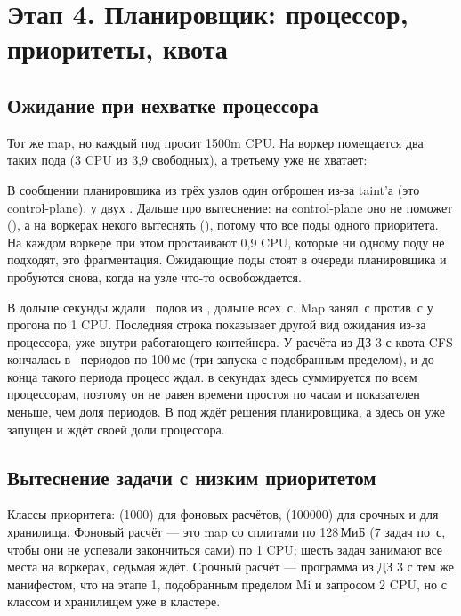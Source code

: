 \section{Этап 4. Планировщик: процессор, приоритеты, квота}\label{sec:sched}

\subsection{Ожидание при нехватке процессора}
Тот же map, но каждый под просит 1500m CPU. На воркер помещается два таких пода (3 CPU из 3,9 свободных), а третьему уже не хватает:


В сообщении планировщика из трёх узлов один отброшен из-за taint'а (это control-plane), у двух . Дальше про вытеснение: на control-plane оно не поможет (), а на воркерах некого вытеснять (), потому что все поды одного приоритета. На каждом воркере при этом простаивают 0,9 CPU, которые ни одному поду не подходят, это фрагментация. Ожидающие поды стоят в очереди планировщика и пробуются снова, когда на узле что-то освобождается.



В  дольше секунды ждали \cpuPendingCount\ подов из \splits, дольше всех \cpuPendingMax\,с. Map занял \cpuMapSpan\,с против \parMapSpan\,с у прогона по 1 CPU. Последняя строка показывает другой вид ожидания из-за процессора, уже внутри работающего контейнера. У расчёта из ДЗ 3 с  квота CFS кончалась в \hwThrPeriods\ периодов по 100\,мс (три запуска с подобранным пределом), и до конца такого периода процесс ждал.  в секундах здесь суммируется по всем процессорам, поэтому он не равен времени простоя по часам и показателен меньше, чем доля периодов. В  под ждёт решения планировщика, а здесь он уже запущен и ждёт своей доли процессора.

\subsection{Вытеснение задачи с низким приоритетом}
Классы приоритета:  (1000) для фоновых расчётов,  (100000) для срочных и  для хранилища. Фоновый расчёт  --- это map со сплитами по 128\,МиБ (7 задач по \lowTaskMed\,с, чтобы они не успевали закончиться сами) по 1 CPU; шесть задач занимают все места на воркерах, седьмая ждёт. Срочный расчёт --- программа из ДЗ 3 с тем же манифестом, что на этапе 1, подобранным пределом \hwLimit Mi и запросом 2 CPU, но с классом  и хранилищем уже в кластере.

